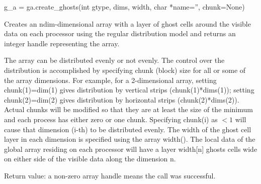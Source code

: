 \documentclass[12pt]{article}
\begin{document}
\begin{pyapi}
\begin{pycode}
g_a = ga.create_ghosts(int gtype, dims, width, char *name='',
                       chunk=None)
\end{pycode}
\begin{funcargs}
\end{funcargs}
\end{pyapi}

\dcoll

\begin{desc}

Creates an ndim-dimensional array with a layer of ghost cells around the
visible data on each processor using the regular distribution model and returns
an integer handle representing the array.

The array can be distributed evenly or not evenly. The control over the
distribution is accomplished by specifying chunk (block) size for all or some
of the array dimensions. For example, for a 2-dimensional array, setting
chunk(1)=dim(1) gives distribution by vertical strips (chunk(1)*dims(1));
setting chunk(2)=dim(2) gives distribution by horizontal strips
(chunk(2)*dims(2)). Actual chunks will be modified so that they are at least
the size of the minimum and each process has either zero or one chunk.
Specifying chunk(i) as $< 1$ will cause that dimension (i-th) to be distributed
evenly. The width of the ghost cell layer in each dimension is specified using
the array width(). The local data of the global array residing on each
processor will have a layer width[n] ghosts cells wide on either side of the
visible data along the dimension n.

Return value: a non-zero array handle means the call was successful.

\end{desc}


\end{document}
